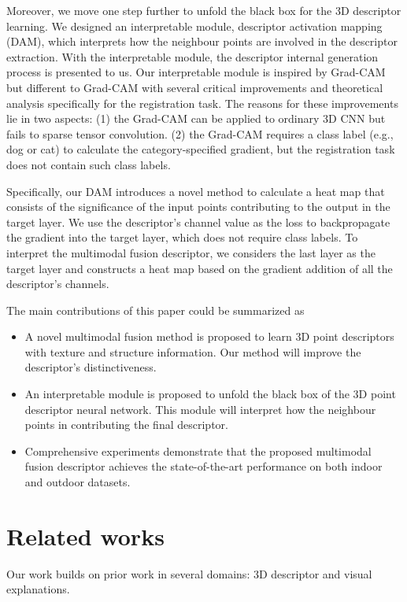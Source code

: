 \documentclass[10pt,twocolumn,letterpaper]{article}
\begin{document}
Moreover, we move one step further to unfold the black box for the 3D descriptor learning. We designed an interpretable module, descriptor activation mapping (DAM), which interprets how the neighbour points are involved in the descriptor extraction. With the interpretable module, the descriptor internal generation process is presented to us. Our interpretable module is inspired by Grad-CAM\cite{selvaraju2017grad} but different to Grad-CAM with several critical improvements and theoretical analysis specifically for the registration task. The reasons for these improvements lie in two aspects: (1) the Grad-CAM can be applied to ordinary 3D CNN but fails to sparse tensor convolution. (2) the Grad-CAM requires a class label (e.g., dog or cat) to calculate the category-specified gradient, but the registration task does not contain such class labels.

Specifically, our DAM introduces a novel method to calculate a heat map that consists of the significance of the input points contributing to the output in the target layer. We use the descriptor's channel value as the loss to backpropagate the gradient into the target layer, which does not require class labels. To interpret the multimodal fusion descriptor, we considers the last layer as the target layer and constructs a heat map based on the gradient addition of all the descriptor's channels. 


The main contributions of this paper could be summarized as
\begin{itemize}
	\item A novel multimodal fusion method is proposed to learn 3D point descriptors with texture and structure information. Our method will improve the descriptor's distinctiveness.
	
	\item An interpretable module is proposed to unfold the black box of the 3D point descriptor neural network. This module will interpret how the neighbour points in contributing the final descriptor.
	
	\item Comprehensive experiments demonstrate that  the proposed multimodal fusion descriptor achieves the state-of-the-art performance on both indoor and outdoor datasets.
	
\end{itemize}

\section{Related works}
Our work builds on prior work in several domains: 3D descriptor and visual explanations.
\end{document}
